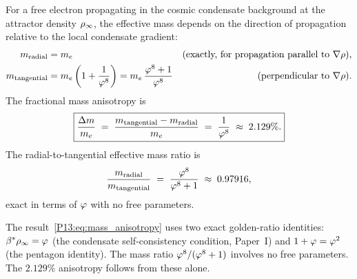\begin{proposition}
\label{P13:prop:mass_anisotropy}
For a free electron propagating in the cosmic condensate background
at the attractor density $\rho_{\infty}$, the effective mass depends on
the direction of propagation relative to the local condensate gradient:
\begin{align}
  m_{\rm radial}
  &= m_e
  &\text{(exactly, for propagation parallel to } \nabla\rho\text{)},
  \label{P13:eq:m_radial}
  \\
  m_{\rm tangential}
  &= m_e\left(1 + \frac{1}{\varphi^8}\right)
   = m_e\,\frac{\varphi^8+1}{\varphi^8}
  &\text{(perpendicular to } \nabla\rho\text{)}.
  \label{P13:eq:m_tangential}
\end{align}
The fractional mass anisotropy is
\begin{equation}
  \boxed{\frac{\Delta m}{m_e}
  \;=\; \frac{m_{\rm tangential} - m_{\rm radial}}{m_e}
  \;=\; \frac{1}{\varphi^8}
  \;\approx\; 2.129\%.}
  \label{P13:eq:mass_anisotropy}
\end{equation}
The radial-to-tangential effective mass ratio is
\begin{equation}
  \frac{m_{\rm radial}}{m_{\rm tangential}}
  \;=\; \frac{\varphi^8}{\varphi^8+1}
  \;\approx\; 0.97916,
  \label{P13:eq:mass_ratio}
\end{equation}
exact in terms of $\varphi$ with no free parameters.
\end{proposition}

\begin{remark}
\label{P13:rem:exact_vs_approx}
The result~\eqref{P13:eq:mass_anisotropy} uses two exact golden-ratio
identities: $\beta^{*}\rho_{\infty}=\varphi$ (the condensate self-consistency
condition, Paper~I) and $1+\varphi=\varphi^2$
(the pentagon identity).
The mass ratio $\varphi^8/(\varphi^8+1)$ involves no free parameters.
The $2.129\%$ anisotropy follows from these alone.
\end{remark}

